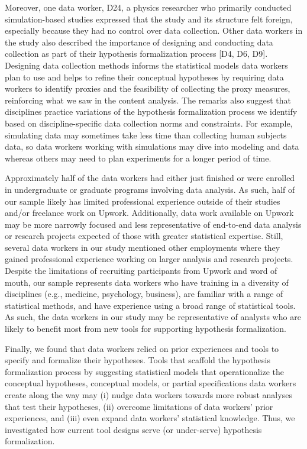 Moreover, one data worker, D24, a physics researcher who primarily conducted
simulation-based studies expressed that the study and its structure felt
foreign, especially because they had no control over data collection. Other data
workers in the study also described the importance of designing and conducting
data collection as part of their hypothesis formalization process [D4, D6, D9].
Designing data collection methods informs the statistical models data workers
plan to use and helps to refine their conceptual hypotheses by requiring data
workers to identify proxies and the feasibility of collecting the proxy
measures, reinforcing what we saw in the content analysis. The remarks also
suggest that disciplines practice variations of the hypothesis formalization
process we identify based on discipline-specific data collection norms and
constraints. For example, simulating data may sometimes take less time than
collecting human subjects data, so data workers working with simulations may
dive into modeling and data whereas others may need to plan experiments for a
longer period of time. 

Approximately half of the data workers had either just finished or were enrolled in undergraduate or
graduate programs involving data analysis. As such, half of our sample likely has
limited professional experience outside of their studies and/or freelance work
on Upwork. Additionally, data work available on Upwork may be more narrowly
focused and less representative of end-to-end data analysis or research projects
expected of those with greater statistical expertise. Still, several data
workers in our study mentioned other employments where they gained professional
experience working on larger analysis and research projects. Despite the
limitations of recruiting participants from Upwork and word of mouth, our sample
represents data workers who have training in a diversity of disciplines (e.g.,
medicine, psychology, business), are familiar with a range of statistical
methods, and have experience using a broad range of statistical tools. As such,
the data workers in our study may be representative of analysts who are likely
to benefit most from new tools for supporting hypothesis formalization. 

Finally, we found that data workers relied on prior experiences and tools to specify
and formalize their hypotheses. Tools that scaffold the hypothesis formalization
process by suggesting statistical models that operationalize the conceptual
hypotheses, conceptual models, or partial specifications data workers create along
the way may (i) nudge data workers towards more
robust analyses that test their hypotheses, (ii) overcome limitations of data workers'
prior experiences, and (iii) even expand data workers' statistical knowledge. Thus, we
investigated how current tool designs serve (or under-serve) hypothesis
formalization.


